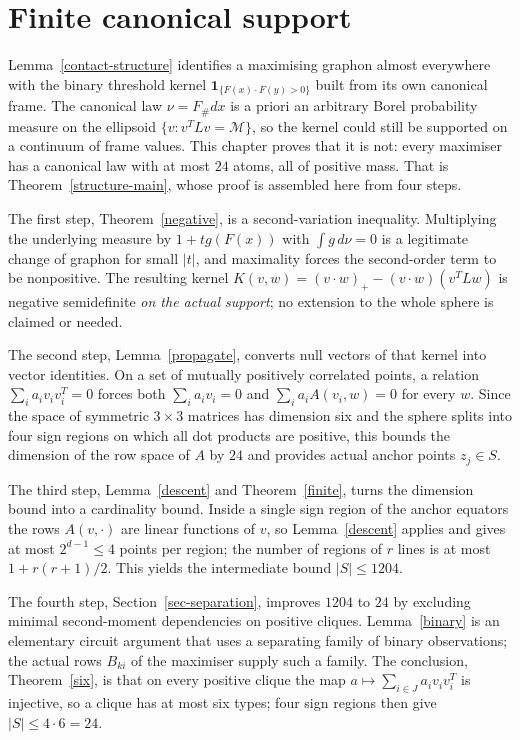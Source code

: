 \chapter{Finite canonical support}\label{ch-support}\label{sec-finite}

Lemma~\ref{contact-structure} identifies a maximising graphon almost
everywhere with the binary threshold kernel $\mathbf1_{\{F(x)\cdot F(y)>0\}}$
built from its own canonical frame. The canonical law $\nu=F_\#dx$ is a
priori an arbitrary Borel probability measure on the ellipsoid
$\{v:v^TLv=\mathcal M\}$, so the kernel could still be supported on a
continuum of frame values. This chapter proves that it is not: every maximiser
has a canonical law with at most $24$ atoms, all of positive mass. That is
Theorem~\ref{structure-main}, whose proof is assembled here from four steps.

The first step, Theorem~\ref{negative}, is a second-variation inequality.
Multiplying the underlying measure by $1+tg(F(x))$ with $\int g\,d\nu=0$ is a
legitimate change of graphon for small $|t|$, and maximality forces the
second-order term to be nonpositive. The resulting kernel
$K(v,w)=(v\cdot w)_+- (v\cdot w)(v^TLw)$ is negative semidefinite \emph{on the
actual support}; no extension to the whole sphere is claimed or needed.

The second step, Lemma~\ref{propagate}, converts null vectors of that kernel
into vector identities. On a set of mutually positively correlated points, a
relation $\sum_i a_iv_iv_i^T=0$ forces both $\sum_ia_iv_i=0$ and
$\sum_ia_iA(v_i,w)=0$ for every $w$. Since the space of symmetric $3\times3$
matrices has dimension six and the sphere splits into four sign regions on
which all dot products are positive, this bounds the dimension of the row
space of $A$ by $24$ and provides actual anchor points $z_j\in S$.

The third step, Lemma~\ref{descent} and Theorem~\ref{finite}, turns the
dimension bound into a cardinality bound. Inside a single sign region of the
anchor equators the rows $A(v,\cdot)$ are linear functions of $v$, so
Lemma~\ref{descent} applies and gives at most $2^{d-1}\le4$ points per region;
the number of regions of $r$ lines is at most $1+r(r+1)/2$. This yields the
intermediate bound $|S|\le1204$.

The fourth step, Section~\ref{sec-separation}, improves $1204$ to $24$ by
excluding minimal second-moment dependencies on positive cliques.
Lemma~\ref{binary} is an elementary circuit argument that uses a separating
family of binary observations; the actual rows $B_{ki}$ of the maximiser
supply such a family. The conclusion, Theorem~\ref{six}, is that on every
positive clique the map $a\mapsto\sum_{i\in J}a_iv_iv_i^T$ is injective, so a
clique has at most six types; four sign regions then give
$|S|\le4\cdot6=24$.

